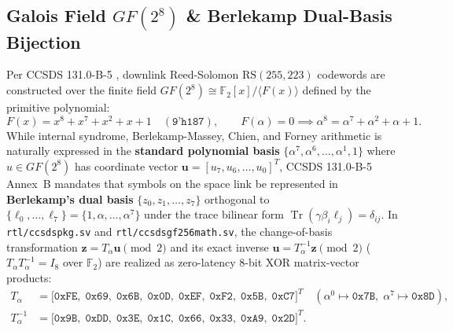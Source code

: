 \documentclass[10pt,a4paper]{article}
\renewcommand{\_}{\origunderscore\penalty0\hskip0pt\relax}
\numberwithin{equation}{section}
\numberwithin{table}{section}
\numberwithin{figure}{section}
\begin{document}
\subsection{Galois Field $GF(2^8)$ \& Berlekamp Dual-Basis Bijection}
Per CCSDS 131.0-B-5 \cite{ccsds131}, downlink Reed-Solomon $\text{RS}(255,223)$ codewords are constructed over the finite field $GF(2^8) \cong \mathbb{F}_2[x]/\langle F(x)\rangle$ defined by the primitive polynomial:
\begin{equation}
  F(x) = x^8 + x^7 + x^2 + x + 1 \quad (\texttt{9'h187}), \qquad F(\alpha) = 0 \implies \alpha^8 = \alpha^7 + \alpha^2 + \alpha + 1.
\end{equation}
While internal syndrome, Berlekamp-Massey, Chien, and Forney arithmetic is naturally expressed in the \textbf{standard polynomial basis} $\{\alpha^7, \alpha^6, \dots, \alpha^1, 1\}$ where $u \in GF(2^8)$ has coordinate vector $\mathbf{u} = [u_7, u_6, \dots, u_0]^T$, CCSDS 131.0-B-5 Annex~B mandates that symbols on the space link be represented in \textbf{Berlekamp's dual basis} $\{z_0, z_1, \dots, z_7\}$ orthogonal to $\{\ell_0, \dots, \ell_7\} = \{1, \alpha, \dots, \alpha^7\}$ under the trace bilinear form $\operatorname{Tr}(\gamma \beta_i \ell_j) = \delta_{ij}$. In \texttt{rtl/ccsds\_pkg.sv} and \texttt{rtl/ccsds\_gf256\_math.sv}, the change-of-basis transformation $\mathbf{z} = T_\alpha \mathbf{u} \pmod 2$ and its exact inverse $\mathbf{u} = T_\alpha^{-1}\mathbf{z} \pmod 2$ ($T_\alpha T_\alpha^{-1} = I_8$ over $\mathbb{F}_2$) are realized as zero-latency 8-bit XOR matrix-vector products:
\begin{equation}
\begin{aligned}
  T_\alpha &= \big[\texttt{0xFE},\; \texttt{0x69},\; \texttt{0x6B},\; \texttt{0x0D},\; \texttt{0xEF},\; \texttt{0xF2},\; \texttt{0x5B},\; \texttt{0xC7}\big]^T \quad (\alpha^0 \mapsto \texttt{0x7B},\; \alpha^7 \mapsto \texttt{0x8D}), \\
  T_\alpha^{-1} &= \big[\texttt{0x9B},\; \texttt{0xDD},\; \texttt{0x3E},\; \texttt{0x1C},\; \texttt{0x66},\; \texttt{0x33},\; \texttt{0xA9},\; \texttt{0x2D}\big]^T.
\end{aligned}
\end{equation}
\end{document}
